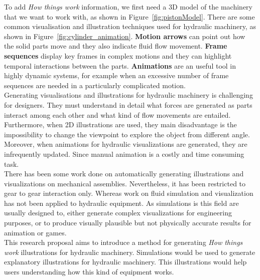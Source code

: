 \documentclass[11pt]{report}
\begin{document}
To add \textit{How things work} information, we first need a 3D model of the machinery that we want to work with, as shown in Figure~\ref{fig:pistonModel}.
There are some common visualisation and illustration techniques used for hydraulic machinery, as shown in Figure~\ref{fig:cylinder_animation}.
\textbf{Motion arrows} can point out how the solid parts move and they also indicate fluid flow movement.
\textbf{Frame sequences} display key frames in complex motions and they can highlight temporal interactions between the parts.
\textbf{Animations} are an useful tool in highly dynamic systems, for example when an excessive number of frame sequences are needed in a particularly complicated motion.\\

Generating visualisations and illustrations for hydraulic machinery is challenging for designers.
They must understand in detail what forces are generated as parts interact among each other and what kind of flow movements are entailed.
Furthermore, when 2D illustrations are used, they main disadvantage is the impossibility to change the viewpoint to explore the object from different angle.
Moreover, when animations for hydraulic visualizations are generated, they are infrequently updated. 
Since manual animation is a costly and time consuming task.\\

There has been some work done on automatically generating illustrations and visualizations on mechanical assemblies.
Nevertheless, it has been restricted to gear to gear interaction only.
Whereas work on fluid simulation and visualization has not been applied to hydraulic equipment.
As simulations is this field are usually designed to, either generate complex visualizations for engineering purposes, or to produce visually plausible but not physically accurate results for animation or games.\\

This research proposal aims to introduce a method for generating \textit{How things work} illustrations for hydraulic machinery.
Simulations would be used to generate explanatory illustrations for hydraulic machinery.
This illustrations would help users understanding how this kind of equipment works.\\
\end{document}
